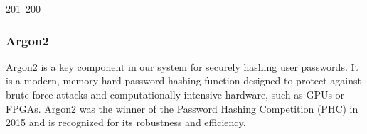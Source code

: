 201~200~\documentclass{article}
\begin{document}
	                                                                                                                                                                                                                                                                                                	                                                                                                                                        	    	                                                                                                	                                                                                                                                                                                                                                                                                                                                	                                                                        	                                                                        	                                                    \subsubsection{Argon2}

	                                                                                                                                                                                                                                                                                                	                                                                                                                                        	    	                                                                                                	                                                                                                                                                                                                                                                                                                                                	                                                                        	                                                                        	                                                    Argon2 is a key component in our system for securely hashing user passwords. It is a modern, memory-hard password hashing function designed to protect against brute-force attacks and computationally intensive hardware, such as GPUs or FPGAs. Argon2 was the winner of the Password Hashing Competition (PHC) in 2015 and is recognized for its robustness and efficiency.
\end{document}
